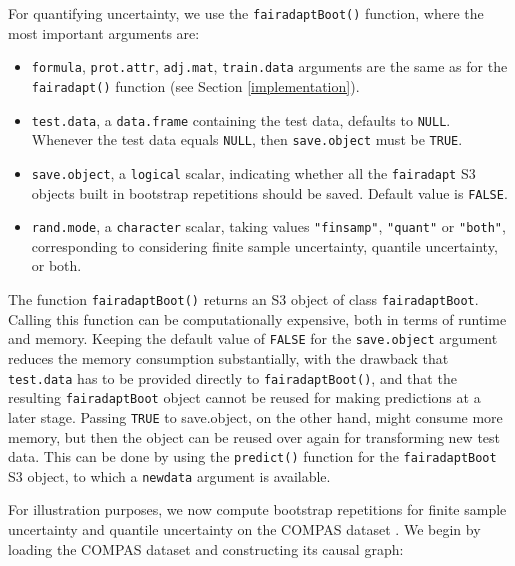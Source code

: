 \documentclass[
  nojss]{jss}
\providecommand{\tightlist}{%
  \setlength{\itemsep}{0pt}\setlength{\parskip}{0pt}}
\begin{document}
For quantifying uncertainty, we use the \texttt{fairadaptBoot()}
function, where the most important arguments are:

\begin{itemize}
\tightlist
\item
  \texttt{formula}, \texttt{prot.attr}, \texttt{adj.mat},
  \texttt{train.data} arguments are the same as for the
  \texttt{fairadapt()} function (see Section \ref{implementation}).
\item
  \texttt{test.data}, a \texttt{data.frame} containing the test data,
  defaults to \texttt{NULL}. Whenever the test data equals
  \texttt{NULL}, then \texttt{save.object} must be \texttt{TRUE}.
\item
  \texttt{save.object}, a \texttt{logical} scalar, indicating whether
  all the \texttt{fairadapt} S3 objects built in bootstrap repetitions
  should be saved. Default value is \texttt{FALSE}.
\item
  \texttt{rand.mode}, a \texttt{character} scalar, taking values
  \texttt{"finsamp"}, \texttt{"quant"} or \texttt{"both"}, corresponding
  to considering finite sample uncertainty, quantile uncertainty, or
  both.
\end{itemize}

The function \texttt{fairadaptBoot()} returns an S3 object of class
\texttt{fairadaptBoot}. Calling this function can be computationally
expensive, both in terms of runtime and memory. Keeping the default
value of \texttt{FALSE} for the \texttt{save.object} argument reduces
the memory consumption substantially, with the drawback that
\texttt{test.data} has to be provided directly to
\texttt{fairadaptBoot()}, and that the resulting \texttt{fairadaptBoot}
object cannot be reused for making predictions at a later stage. Passing
\texttt{TRUE} to save.object, on the other hand, might consume more
memory, but then the object can be reused over again for transforming
new test data. This can be done by using the \texttt{predict()} function
for the \texttt{fairadaptBoot} S3 object, to which a \texttt{newdata}
argument is available.

For illustration purposes, we now compute bootstrap repetitions for
finite sample uncertainty and quantile uncertainty on the COMPAS dataset
\citep{larson2016compas}. We begin by loading the COMPAS dataset and
constructing its causal graph:
\end{document}
